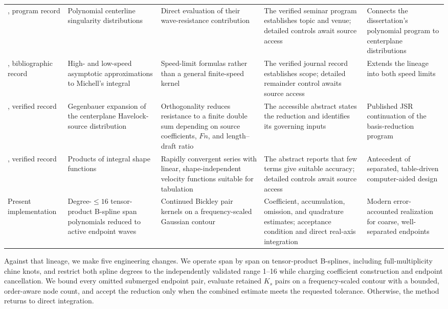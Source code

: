 \documentclass[10pt]{article}
\newcommand{\Fn}{\mathit{Fn}}
\begin{document}
\begin{table}[t]
\begin{tabular}{@{}p{}p{}p{}p{}p{}@{}}
\addlinespace
\citet{Michelsen1963}, program record
& Polynomial centerline singularity distributions
& Direct evaluation of their wave-resistance contribution
& The verified seminar program establishes topic and venue; detailed controls await source access
& Connects the dissertation's polynomial program to centerplane distributions\\
\addlinespace
\citet{Michelsen1966}, bibliographic record
& High- and low-speed asymptotic approximations to Michell's integral
& Speed-limit formulas rather than a general finite-speed kernel
& The verified journal record establishes scope; detailed remainder control awaits source access
& Extends the lineage into both speed limits\\
\addlinespace
\citet{Michelsen1972}, verified record
& Gegenbauer expansion of the centerplane Havelock-source distribution
& Orthogonality reduces resistance to a finite double sum depending on source coefficients, \(\Fn\), and length--draft ratio
& The accessible abstract states the reduction and identifies its governing inputs
& Published JSR continuation of the basis-reduction program\\
\addlinespace
\citet{SendagortaGrases1988}, verified record
& Products of integral shape functions
& Rapidly convergent series with linear, shape-independent velocity functions suitable for tabulation
& The abstract reports that few terms give suitable accuracy; detailed controls await source access
& Antecedent of separated, table-driven computer-aided design\\
\addlinespace
Present implementation
& Degree-\(\leq16\) tensor-product B-spline span polynomials reduced to active endpoint waves
& Continued Bickley pair kernels on a frequency-scaled Gaussian contour
& Coefficient, accumulation, omission, and quadrature estimates; acceptance condition and direct real-axis integration
& Modern error-accounted realization for coarse, well-separated endpoints\\
\bottomrule
\end{tabular}
\end{table}

Against that lineage, we make five engineering changes.  We operate span by
span on tensor-product B-splines, including full-multiplicity chine knots, and
restrict both spline degrees to the independently validated range 1--16 while
charging coefficient construction and endpoint cancellation.  We bound every
omitted submerged endpoint pair, evaluate retained \(K_s\) pairs on a
frequency-scaled contour with a bounded, order-aware node count, and accept the
reduction only when the combined estimate meets the requested tolerance.
Otherwise, the method returns to direct integration.
\end{document}
